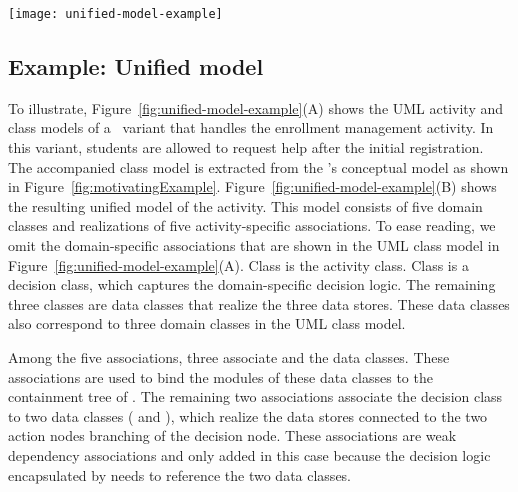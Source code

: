 \begin{figure*}[ht]
	\begin{center}
		\texttt{[image: unified-model-example]}
	\end{center}
	\caption{(A: Left) The UML activity and class models of a \courseman~software variant that handles the enrollment management activity; (B: Right) The unified model that results.} %
	\label{fig:unified-model-example}
\end{figure*} 

\subsection*{Example: Unified model}

To illustrate, Figure~\ref{fig:unified-model-example}(A) shows the UML activity and class models of a \courseman~variant that handles the enrollment management activity. In this variant, students are allowed to request help after the initial registration. The accompanied class model is extracted from the \courseman's conceptual model as shown in Figure~\ref{fig:motivatingExample}.
%
Figure~\ref{fig:unified-model-example}(B) shows the resulting unified model of the activity.
This model consists of five domain classes and realizations of five activity-specific associations. To ease reading, we omit the domain-specific associations that are shown in the UML class model in Figure~\ref{fig:unified-model-example}(A). Class  is the activity class. Class  is a decision class, which captures the domain-specific decision logic. The remaining three classes are data classes that realize the three data stores. These data classes also correspond to three domain classes in the UML class model. 

Among the five associations, three associate  and the data classes. These associations are used to bind the modules of these data classes to the containment tree of .
The remaining two associations associate the decision class  to two data classes ( and ), which realize the data stores connected to the two action nodes branching of the decision node. These associations are weak dependency associations and only added in this case because the decision logic encapsulated by  needs to reference the two data classes.
%
